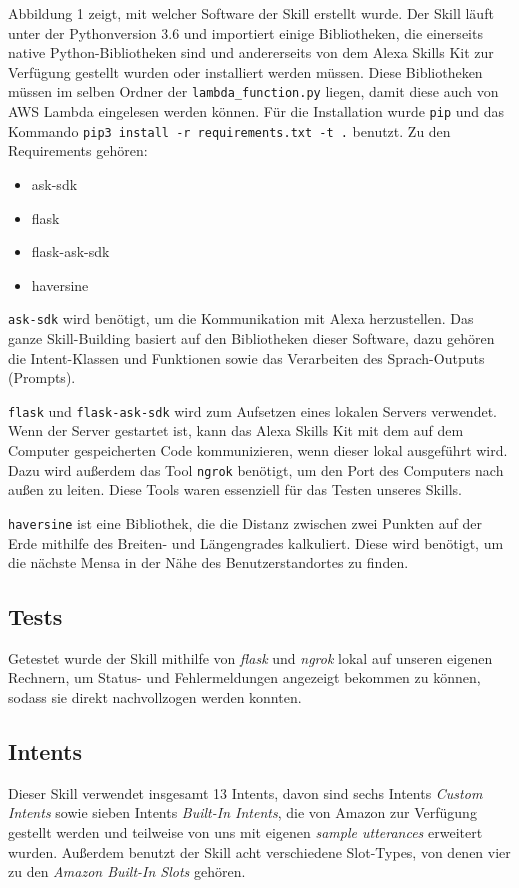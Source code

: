 \documentclass[12pt]{article}
\begin{document}
Abbildung 1 zeigt, mit welcher Software der Skill erstellt wurde.
Der Skill läuft unter der Pythonversion 3.6 und importiert einige Bibliotheken, die einerseits native Python-Bibliotheken sind und andererseits von dem Alexa Skills Kit zur Verfügung gestellt wurden oder installiert werden müssen.
Diese Bibliotheken müssen im selben Ordner der \texttt{lambda\_function.py} liegen, damit diese auch von AWS Lambda eingelesen werden können.
Für die Installation wurde \texttt{pip} und das Kommando \texttt{pip3 install -r requirements.txt -t .} benutzt.
Zu den Requirements gehören:
\begin{itemize}
	\setlength\itemsep{0em}
	\item ask-sdk
	\item flask
	\item flask-ask-sdk
	\item haversine
\end{itemize}

\texttt{ask-sdk} wird benötigt, um die Kommunikation mit Alexa herzustellen.
Das ganze Skill-Building basiert auf den Bibliotheken dieser Software, dazu gehören die Intent-Klassen und Funktionen sowie das Verarbeiten des Sprach-Outputs (Prompts). 

\texttt{flask} und \texttt{flask-ask-sdk} wird zum Aufsetzen eines lokalen Servers verwendet.
Wenn der Server gestartet ist, kann das Alexa Skills Kit mit dem auf dem Computer gespeicherten Code kommunizieren, wenn dieser lokal ausgeführt wird.
Dazu wird außerdem das Tool \texttt{ngrok} benötigt, um den Port des Computers nach außen zu leiten.
Diese Tools waren essenziell für das Testen unseres Skills. 

\texttt{haversine} ist eine Bibliothek, die die Distanz zwischen zwei Punkten auf der Erde mithilfe des Breiten- und Längengrades kalkuliert.
Diese wird benötigt, um die nächste Mensa in der Nähe des Benutzerstandortes zu finden.

\subsection{Tests}
Getestet wurde der Skill mithilfe von \emph{flask} und \emph{ngrok} lokal auf unseren eigenen Rechnern, um Status- und Fehlermeldungen angezeigt bekommen zu können, sodass sie direkt nachvollzogen werden konnten. 

\subsection{Intents}
Dieser Skill verwendet insgesamt 13 Intents, davon sind sechs Intents \emph{Custom Intents} sowie sieben Intents \emph{Built-In Intents}, die von Amazon zur Verfügung gestellt werden und teilweise von uns mit eigenen \emph{sample utterances} erweitert wurden. 
Außerdem benutzt der Skill acht verschiedene Slot-Types, von denen vier zu den \emph{Amazon Built-In Slots} gehören.
\end{document}
